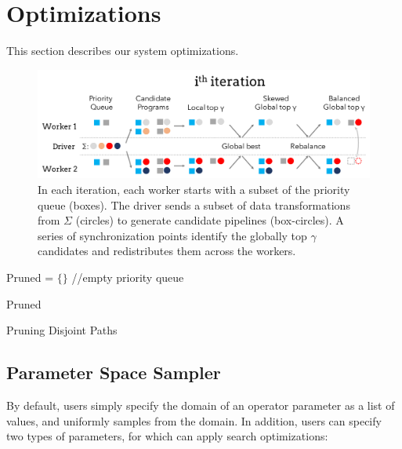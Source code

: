 \section{Optimizations}\label{s:search}
This section describes our system optimizations.

\begin{figure}[t]
    \centering
    \includegraphics[width=\columnwidth]{figures/distributed.pdf}
    \caption{In each iteration, each worker starts with a subset of the priority queue (boxes).  The driver sends a subset of data transformations from $\Sigma$ (circles) to generate candidate pipelines (box-circles).  A series of synchronization points identify the globally top $\gamma$ candidates and redistributes them across the workers.   \label{fig:algo}}
\end{figure}


{
\begin{algorithm}[t]

 Pruned = $\{\}$  //empty priority queue



\Return Pruned
\caption{Pruning Disjoint Paths}
\label{alg:pruning}
\end{algorithm}
}


\subsection{Parameter Space Sampler}
By default, users simply specify the domain of an operator parameter as a list of values, and \sys uniformly samples from the domain.  In addition, users can specify two types of parameters, for which \sys can apply search optimizations:

